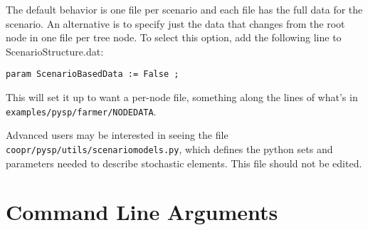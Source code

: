 The default behavior is one file per scenario and each file has the full data
for the scenario. An alternative is to specify just the data that changes from
the root node in one file per tree node. To select this option, add the
following line to ScenarioStructure.dat:

\verb|param ScenarioBasedData := False ;|

This will set it up to want a per-node file, something along the lines of what's
in \verb|examples/pysp/farmer/NODEDATA|.

Advanced users may be interested in seeing the file
\verb|coopr/pysp/utils/scenariomodels.py|, which defines the python sets and
parameters needed to describe stochastic elements. This file should not be
edited.

\section{Command Line Arguments \label{cmdargsec}}

